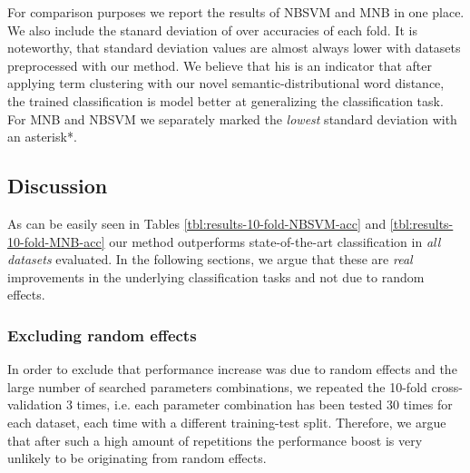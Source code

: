 \begin{table}
\caption{For comparison purposes we report the results of NBSVM and MNB in one place. We also include the stanard deviation of over accuracies of each fold. 
It is noteworthy, that standard deviation values are almost always lower with datasets preprocessed with our method. We believe that his is an indicator that after 
applying term clustering with our novel semantic-distributional word distance, the trained classification is model better at generalizing the 
classification task. For MNB and NBSVM we separately marked the 
\emph{lowest} standard deviation with an asterisk*.}
\label{tbl:all-stds-and-accs}                                                                           
\end{table}                                                                                          

\subsection{Discussion}

As can be easily seen in Tables \ref{tbl:results-10-fold-NBSVM-acc} and \ref{tbl:results-10-fold-MNB-acc} our method outperforms state-of-the-art classification in \emph{all
datasets} evaluated. In the following sections, we argue that these are \emph{real} improvements in the underlying classification tasks and not due to random effects.

\subsubsection{Excluding random effects}
 In order to exclude that performance increase was due to random effects and the large number of searched parameters combinations, we repeated the 10-fold cross-validation 3 times, 
i.e. each parameter combination has been tested 30 times for each dataset, each time with a different training-test split. Therefore, we argue that after such
a high amount of repetitions the performance boost is very unlikely to be originating from random effects. 

